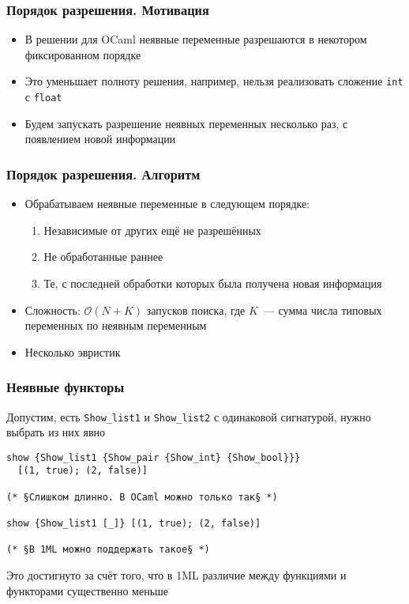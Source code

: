 \documentclass{beamer}
\begin{document}
\begin{frame}\frametitle{Порядок разрешения. Мотивация}
\begin{itemize}
  \item В решении для OCaml неявные переменные разрешаются в некотором фиксированном порядке
  \item Это уменьшает полноту решения, например, нельзя реализовать сложение \texttt{int} с \texttt{float}
  \item Будем запускать разрешение неявных переменных несколько раз, с появлением новой информации
\end{itemize}
\end{frame}

\begin{frame}\frametitle{Порядок разрешения. Алгоритм}
\begin{itemize}
  \item Обрабатываем неявные переменные в следующем порядке:
  \begin{enumerate}
    \item Независимые от других ещё не разрешённых
    \item Не обработанные раннее
    \item Те, с последней обработки которых была получена новая информация
  \end{enumerate}
  \item Сложность: $\mathcal{O}(N + K)$ запусков поиска, где $K$~--- сумма числа типовых переменных по неявным переменным
  \item Несколько эвристик
\end{itemize}
\end{frame}

\lstset{language=caml}
\begin{frame}[fragile]\frametitle{Неявные функторы}
Допустим, есть \texttt{Show\_list1} и \texttt{Show\_list2} с одинаковой сигнатурой, нужно выбрать из них явно
\begin{lstlisting}
show {Show_list1 {Show_pair {Show_int} {Show_bool}}}
  [(1, true); (2, false)]

(* §Слишком длинно. В OCaml можно только так§ *)

show {Show_list1 [_]} [(1, true); (2, false)]

(* §В 1ML можно поддержать такое§ *)
\end{lstlisting}
Это достигнуто за счёт того, что в 1ML различие между функциями и функторами существенно меньше
\end{frame}
\end{document}
